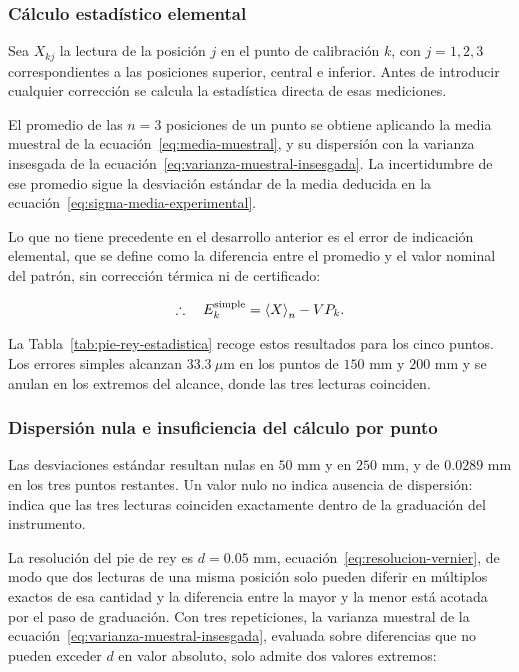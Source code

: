 \subsubsection{Cálculo estadístico elemental}
\label{sec:pie-rey-estadistica}

Sea $X_{kj}$ la lectura de la posición $j$ en el punto de calibración $k$, con
$j = 1, 2, 3$ correspondientes a las posiciones superior, central e inferior. Antes
de introducir cualquier corrección se calcula la estadística directa de esas
mediciones.

El promedio de las $n = 3$ posiciones de un punto se obtiene aplicando la media
muestral de la ecuación~\eqref{eq:media-muestral}, y su dispersión con la varianza
insesgada de la ecuación~\eqref{eq:varianza-muestral-insesgada}. La incertidumbre de
ese promedio sigue la desviación estándar de la media deducida en la
ecuación~\eqref{eq:sigma-media-experimental}.

Lo que no tiene precedente en el desarrollo anterior es el error de indicación
elemental, que se define como la diferencia entre el promedio y el valor nominal del
patrón, sin corrección térmica ni de certificado:

\begin{equation}
    \therefore\quad
    E_k^{\text{simple}} = \left\langle X \right\rangle_n - VP_k .
    \label{eq:E-simple}
\end{equation}

La Tabla~\ref{tab:pie-rey-estadistica} recoge estos resultados para los cinco puntos.
Los errores simples alcanzan $33.3\ \mu\text{m}$ en los puntos de $150$ mm y $200$ mm
y se anulan en los extremos del alcance, donde las tres lecturas coinciden.



\subsubsection*{Dispersión nula e insuficiencia del cálculo por punto}

Las desviaciones estándar resultan nulas en $50$ mm y en $250$ mm, y de
$0.0289$ mm en los tres puntos restantes. Un valor nulo no indica ausencia de
dispersión: indica que las tres lecturas coinciden exactamente dentro de la
graduación del instrumento.

La resolución del pie de rey es $d = 0.05$ mm, ecuación~\eqref{eq:resolucion-vernier},
de modo que dos lecturas de una misma posición solo pueden diferir en múltiplos
exactos de esa cantidad y la diferencia entre la mayor y la menor está acotada por
el paso de graduación. Con tres repeticiones, la varianza muestral de la
ecuación~\eqref{eq:varianza-muestral-insesgada}, evaluada sobre diferencias que no
pueden exceder $d$ en valor absoluto, solo admite dos valores extremos:

